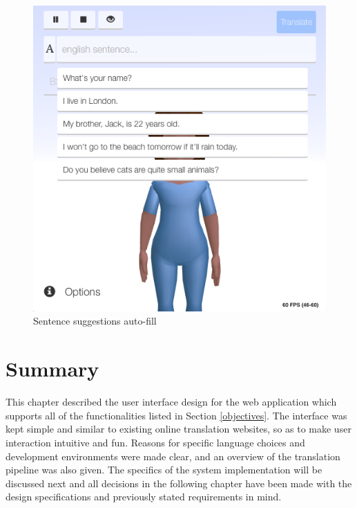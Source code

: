 \documentclass[12pt]{ociamthesis}  %
\begin{document}
\begin{figure}[h]
	\centering
    \includegraphics[scale=0.4]{chapter3/suggestions}
    \caption{Sentence suggestions auto-fill}
    \label{fig:suggestions}
\end{figure}

\section{Summary}
This chapter described the user interface design for the web application which supports all of the functionalities listed in Section \ref{objectives}. The interface was kept simple and similar to existing online translation websites, so as to make user interaction intuitive and fun. Reasons for specific language choices and development environments were made clear, and an overview of the translation pipeline was also given. The specifics of the system implementation will be discussed next and all decisions in the following chapter have been made with the design specifications and previously stated requirements in mind.
\end{document}
